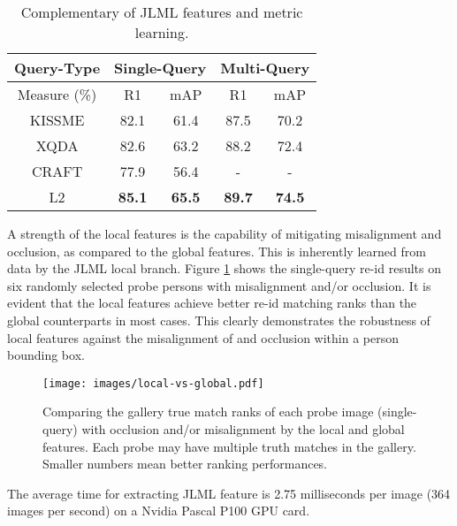 \documentclass{article}
\begin{document}
\begin{table} [h]
	\centering
	\footnotesize
\renewcommand{\arraystretch}{1}
	\setlength{\tabcolsep}{0.4 cm}
\caption{\footnotesize
	Complementary of JLML features and metric learning.
	}
	\vskip 0pt \begin{tabular}{|c|cc|cc|}
		\hline
Query-Type &  \multicolumn{2}{c|}{Single-Query} &\multicolumn{2}{c|}{Multi-Query} \\ \hline
		Measure (\%)     
		& R1 & mAP & R1 & mAP  \\ \hline \hline
		KISSME & 82.1 & 61.4 & 87.5 & 70.2\\
		XQDA & 82.6 & 63.2 & 88.2 & 72.4\\
		CRAFT & 77.9 & 56.4 & - & -\\
		\hline
		L2 & \bf 85.1 &  \bf 65.5  &  \bf 89.7 & \bf 74.5 \\
		\hline
	\end{tabular}\label{tab:metric_learning}
	\vspace{-0.3cm}
\end{table}


\vspace{0.1cm}
{A strength of the local features is the capability 
	of mitigating misalignment and occlusion, as compared to the global features.  
	This is inherently learned from data by the JLML local branch. 
	Figure \ref{fig:local_global} shows the single-query re-id results on six randomly selected probe persons with misalignment and/or occlusion.
It is evident that the local features achieve better re-id matching ranks than the global counterparts in most cases.
	This clearly demonstrates the robustness of local features against the misalignment of and occlusion within a person bounding box.}


\begin{figure} [h]
	\centering
	\texttt{[image: images/local-vs-global.pdf]}
	\vskip -0.3cm
	\caption{\footnotesize 
Comparing the gallery true match ranks of each probe image (single-query) with occlusion and/or misalignment by the local and global features. Each probe may have multiple truth matches in the gallery. Smaller numbers mean better ranking performances.
	}
	\label{fig:local_global}
\end{figure}


\vspace{0.1cm}
{The average time for extracting JLML feature
	is 2.75 milliseconds per image (364 images per second)
	on a Nvidia Pascal P100 GPU card.}
\end{document}
